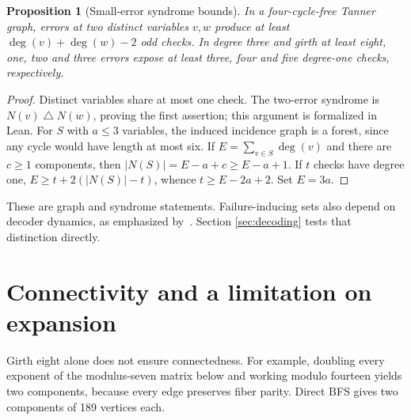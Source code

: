 \documentclass[11pt]{article}
\newtheorem{proposition}[theorem]{Proposition}
\theoremstyle{definition}
\theoremstyle{remark}
\begin{document}
\begin{proposition}[Small-error syndrome bounds]\label{prop:syndrome}
In a four-cycle-free Tanner graph, errors at two distinct variables
$v,w$ produce at least $\deg(v)+\deg(w)-2$ odd checks. In degree three
and girth at least eight, one, two and three errors expose at least
three, four and five degree-one checks, respectively.
\end{proposition}
\begin{proof}
Distinct variables share at most one check. The two-error syndrome is
$N(v)\mathbin{\triangle}N(w)$, proving the first assertion; this argument
is formalized in Lean. For $S$ with $a\le3$ variables, the induced
incidence graph is a forest, since any cycle would have length at most
six. If $E=\sum_{v\in S}\deg(v)$ and there are $c\ge1$ components,
then $|N(S)|=E-a+c\ge E-a+1$. If $t$ checks have degree one,
$E\ge t+2(|N(S)|-t)$, whence $t\ge E-2a+2$. Set $E=3a$.
\end{proof}

These are graph and syndrome statements. Failure-inducing sets also depend
on decoder dynamics, as emphasized by~\cite{RV2021,MPK2026}. Section
\ref{sec:decoding} tests that distinction directly.

\section{Connectivity and a limitation on expansion}\label{sec:expansion}

Girth eight alone does not ensure connectedness. For example, doubling
every exponent of the modulus-seven matrix below and working modulo
fourteen yields two components, because every edge preserves fiber parity.
Direct BFS gives two components of 189 vertices each.
\end{document}
